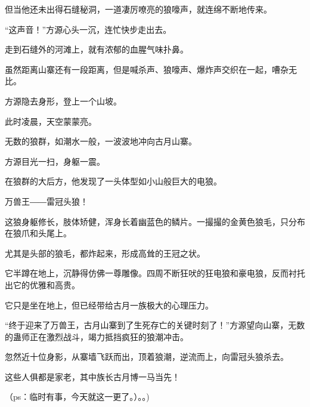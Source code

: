 \begin{this_body}
但当他还未出得石缝秘洞，一道凄厉嘹亮的狼嚎声，就连绵不断地传来。

“这声音！”方源心头一沉，连忙快步走出去。

走到石缝外的河滩上，就有浓郁的血腥气味扑鼻。

虽然距离山寨还有一段距离，但是喊杀声、狼嚎声、爆炸声交织在一起，嘈杂无比。

方源隐去身形，登上一个山坡。

此时凌晨，天空蒙蒙亮。

无数的狼群，如潮水一般，一波波地冲向古月山寨。

方源目光一扫，身躯一震。

在狼群的大后方，他发现了一头体型如小山般巨大的电狼。

万兽王――雷冠头狼！

这狼身躯修长，肢体矫健，浑身长着幽蓝色的鳞片。一撮撮的金黄色狼毛，只分布在狼爪和头尾上。

尤其是头部的狼毛，都炸起来，形成高耸的王冠之状。

它半蹲在地上，沉静得仿佛一尊雕像。四周不断狂吠的狂电狼和豪电狼，反而衬托出它的优雅和高贵。

它只是坐在地上，但已经带给古月一族极大的心理压力。

“终于迎来了万兽王，古月山寨到了生死存亡的关键时刻了！”方源望向山寨，无数的蛊师正在激烈战斗，竭力抵挡疯狂的狼潮冲击。

忽然近十位身影，从寨墙飞跃而出，顶着狼潮，逆流而上，向雷冠头狼杀去。

这些人俱都是家老，其中族长古月博一马当先！

（ps：临时有事，今天就这一更了。）。。)

\end{this_body}

